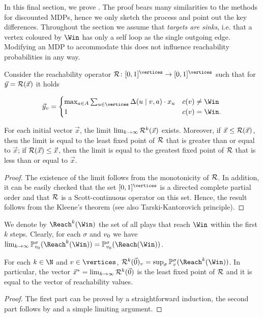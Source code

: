 In this final section, we prove . The proof bears many similarities to the methods for discounted MDPs, hence we only sketch the process and point out the key differences. Throughout the section we assume that \emph{targets are sinks}, i.e. that a vertex coloured by $\Win$ has only a self loop as the single outgoing edge. Modifying an MDP to accommodate this does not influence reachability probabilities in any way.

Consider the reachability operator $\ReachOp\colon[0,1]^{\vertices}\rightarrow [0,1]^{\vertices}$ such that for $\vec{y} = \mathcal{R}(\vec{x})$ it holds

\[
\vec{y}_v = \begin{cases}

 \max_{a\in \actions} \sum_{u\in \vertices} \probTranFunc(u \mid v,a)\cdot x_u & \colouring(v) \neq \Win \\
 1 & \colouring(v) = \Win.
\end{cases} 
\]

\begin{lemma}
\label{5-lem:quant-reach-operator-fixed-point}
For each initial vector $\vec{x}$, the limit $\lim_{k \rightarrow \infty}\mathcal{R}^k(\vec{x})$ exists. Moreover, if $\vec{x} \leq \mathcal{R}(\vec{x})$, then the limit is equal to the least fixed point of $\mathcal{R}$ that is greater than or equal to $\vec{x}$; if $\mathcal{R}(\vec{x})\leq \vec{x}$, then the limit is equal to the greatest fixed point of $\mathcal{R}$ that is less than or equal to $\vec{x}$.
\end{lemma}
\begin{proof}
The existence of the limit follows from the monotonicity of $\mathcal{R}$.
In addition, it can be easily checked that the set $[0,1]^{\vertices}$ is a directed complete partial order and that $\mathcal{R}$ is a Scott-continuous operator on this set. Hence, the result follows from the Kleene's theorem (see also Tarski-Kantorovich principle).
\end{proof}

We denote by $\Reach^k(\Win)$ the set of all plays that reach $\Win$ within the first $k$ steps. Clearly, for each $\sigma$ and $v_0$ we have $\lim_{k \rightarrow \infty} \probm^\sigma_{\vinit}(\Reach^k(\Win)) = \probm^\sigma_{\vinit}(\Reach(\Win))$.

\begin{lemma}
\label{5-lem:quant-reach-step-operator}
For each $k\in \N$ and $v\in \vertices$, $\ReachOp^k(\vec{0})_v = \sup_{\sigma}\probm^\sigma_v(\Reach^k(\Win))$. In particular, the vector $\vec{x}^* = \lim_{k \rightarrow\infty} \mathcal{R}^k(\vec{0})$ is the least fixed point of $ \mathcal{R} $ and it is equal to the vector of reachability values. 
\end{lemma}
\begin{proof}
The first part can be proved by a straightforward induction, the second part follows by  and a simple limiting argument.
\end{proof}




